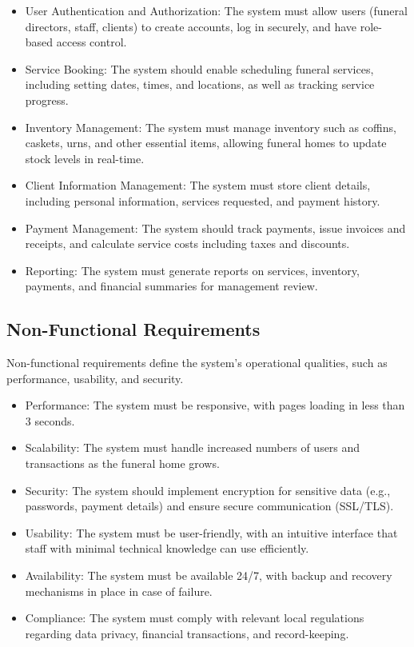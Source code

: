 \documentclass[a4paper,12pt]{report}
\begin{document}
\begin{itemize}
    \item User Authentication and Authorization: The system must allow users (funeral directors, staff, clients) to create accounts, log in securely, and have role-based access control.
    \item Service Booking: The system should enable scheduling funeral services, including setting dates, times, and locations, as well as tracking service progress.
    \item Inventory Management: The system must manage inventory such as coffins, caskets, urns, and other essential items, allowing funeral homes to update stock levels in real-time.
    \item Client Information Management: The system must store client details, including personal information, services requested, and payment history.
    \item Payment Management: The system should track payments, issue invoices and receipts, and calculate service costs including taxes and discounts.
    \item Reporting: The system must generate reports on services, inventory, payments, and financial summaries for management review.
\end{itemize}

\subsection{Non-Functional Requirements}
Non-functional requirements define the system’s operational qualities, such as performance, usability, and security.

\begin{itemize}
    \item Performance: The system must be responsive, with pages loading in less than 3 seconds.
    \item Scalability: The system must handle increased numbers of users and transactions as the funeral home grows.
    \item Security: The system should implement encryption for sensitive data (e.g., passwords, payment details) and ensure secure communication (SSL/TLS).
    \item Usability: The system must be user-friendly, with an intuitive interface that staff with minimal technical knowledge can use efficiently.
    \item Availability: The system must be available 24/7, with backup and recovery mechanisms in place in case of failure.
    \item Compliance: The system must comply with relevant local regulations regarding data privacy, financial transactions, and record-keeping.
\end{itemize}
\end{document}
